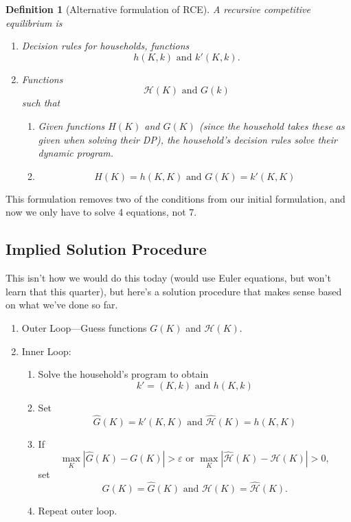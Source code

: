 \documentclass[11pt]{article}
\newtheorem*{definition}{Definition}
\begin{document}
\begin{definition}[Alternative formulation of RCE]
A recursive competitive equilibrium is
\begin{enumerate}
\item Decision rules for households, functions
\[
h(K, k) \text{ and } k'(K, k). 
\]
\item Functions
\[
\mathcal{H}(K) \text{ and }G (k)
\]
such that 
\begin{enumerate}[label=(\alph*)]
\item Given functions $H(K)$ and $G(K)$ (since the household takes these as given when solving their DP), the household's decision rules solve their dynamic program.
\item
\[
H(K) = h(K, K) \text{ and } G(K) = k'(K, K)
\]
\end{enumerate}
\end{enumerate}
\end{definition}
This formulation removes two of the conditions from our initial formulation, and now we only have to solve 4 equations, not 7. 

\subsection{Implied Solution Procedure}
\label{sec:org3398f61}
This isn't how we would do this today (would use Euler equations, but won't learn that this quarter), but here's a solution procedure that makes sense based on what we've done so far.

\begin{enumerate}
\item Outer Loop---Guess functions $G(K)$ and $\mathcal{H}(K)$.
\item Inner Loop:
\begin{enumerate}
\item Solve the household's program to obtain
\[
k' = (K, k) \text{ and } h(K, k)
\]
\item Set 
\[
\hat{G}(K) = k'(K, K) \text{ and } \hat{\mathcal{H}}(K) = h(K, K)
\]
\item If 
\[
\max_K |\hat{G}(K) - G(K)| > \varepsilon \text{ or } \max_K |\hat{\mathcal{H}}(K) - \mathcal{H}(K)| > 0,
\]
set 
\[
G(K) = \hat{G}(K) \text{ and }\mathcal{H}(K) = \hat{\mathcal{H}}(K).
\]
\item Repeat outer loop.
\end{enumerate}
\end{enumerate}
\end{document}
